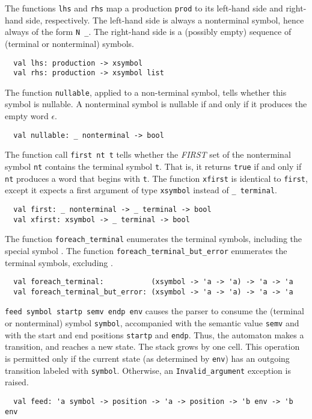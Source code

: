 \documentclass[onecolumn,11pt,nocopyrightspace,preprint]{sigplanconf}
\begin{document}

The functions \verb+lhs+ and \verb+rhs+ map a production \verb+prod+ to
its left-hand side and right-hand side, respectively. The left-hand side
is always a nonterminal symbol, hence always of the form \verb+N _+. The
right-hand side is a (possibly empty) sequence of (terminal or nonterminal)
symbols.
%
\begin{verbatim}
  val lhs: production -> xsymbol
  val rhs: production -> xsymbol list
\end{verbatim}
%


The function \verb+nullable+, applied to a non-terminal symbol,
tells whether this symbol is nullable. A nonterminal symbol is nullable if and
only if it produces the empty word $\epsilon$.
%
\begin{verbatim}
  val nullable: _ nonterminal -> bool
\end{verbatim}


The function call \verb+first nt t+ tells whether the \emph{FIRST} set of the
nonterminal symbol \verb+nt+ contains the terminal symbol \verb+t+. That is,
it returns \verb+true+ if and only if \verb+nt+ produces a word that begins
with \verb+t+. The function \verb+xfirst+ is identical to \verb+first+, except
it expects a first argument of type \verb+xsymbol+ instead of \verb+_ terminal+.
%
\begin{verbatim}
  val first: _ nonterminal -> _ terminal -> bool
  val xfirst: xsymbol -> _ terminal -> bool
\end{verbatim}


The function \verb+foreach_terminal+ enumerates the terminal symbols, including the special symbol \error.
The function \verb+foreach_terminal_but_error+ enumerates the terminal symbols, excluding \error.
\begin{verbatim}
  val foreach_terminal:           (xsymbol -> 'a -> 'a) -> 'a -> 'a
  val foreach_terminal_but_error: (xsymbol -> 'a -> 'a) -> 'a -> 'a
\end{verbatim}


\verb+feed symbol startp semv endp env+ causes the parser to consume the
(terminal or nonterminal) symbol \verb+symbol+, accompanied with the semantic
value \verb+semv+ and with the start and end positions \verb+startp+ and
\verb+endp+. Thus, the automaton makes a transition, and reaches a new state.
The stack grows by one cell. This operation is permitted only if the current
state (as determined by \verb+env+) has an outgoing transition labeled with
\verb+symbol+. Otherwise, an \verb+Invalid_argument+ exception is raised.
\begin{verbatim}
  val feed: 'a symbol -> position -> 'a -> position -> 'b env -> 'b env
\end{verbatim}
\end{document}
